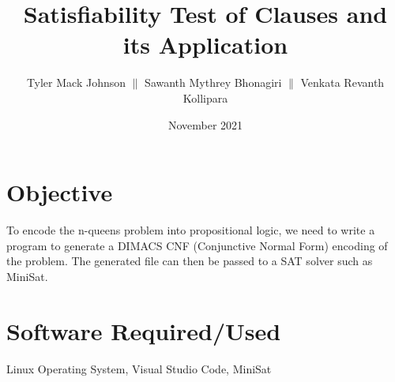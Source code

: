 \documentclass[12pt, letterpaper]{article}
\begin{document}
\title{\textbf{Satisfiability Test of Clauses and its Application}}
\author{Tyler Mack Johnson $\|$ Sawanth Mythrey Bhonagiri $\|$ Venkata Revanth Kollipara}
\date{November 2021}
\maketitle
\newpage
\setlength{\topmargin}{-1.75cm} \setlength{\textheight}{23.5cm}
\setlength{\oddsidemargin}{0.25cm}
\setlength{\evensidemargin}{0.25cm} \setlength{\textwidth}{16.2cm}
\section*{Objective}
To encode the n-queens problem into propositional logic, we need to write a program to generate a DIMACS CNF (Conjunctive Normal Form) encoding of the problem. The generated file can then be passed to a SAT solver such as MiniSat.
\section*{Software Required/Used}
Linux Operating System, Visual Studio Code, MiniSat
\end{document}
